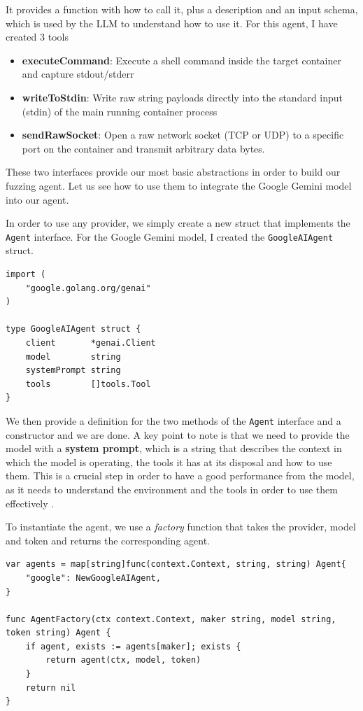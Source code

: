 It provides a function with how to call it, plus a description and an input schema, which is used by the LLM to understand how to use it.
For this agent, I have created 3 tools

\begin{itemize}
   \item \textbf{executeCommand}: Execute a shell command inside the target container and capture stdout/stderr
   \item \textbf{writeToStdin}: Write raw string payloads directly into the standard input (stdin) of the main running container process
   \item \textbf{sendRawSocket}: Open a raw network socket (TCP or UDP) to a specific port on the container and transmit arbitrary data bytes.
\end{itemize}


These two interfaces provide our most basic abstractions in order to build our fuzzing agent. Let us see how to use them to integrate the Google Gemini model into our agent.

In order to use any provider, we simply create a new struct that implements the \texttt{Agent} interface. For the Google Gemini model, I created the \texttt{GoogleAIAgent} struct.

\lstset{language=Go,caption=Google Ai Agent,label=lst:google-ai-agent}
\begin{lstlisting}
import (
	"google.golang.org/genai"
)

type GoogleAIAgent struct {
	client       *genai.Client
	model        string
	systemPrompt string
	tools        []tools.Tool
}
\end{lstlisting}

We then provide a definition for the two methods of the \texttt{Agent} interface and a constructor and we are done.
A key point to note is that we need to provide the model with a \textbf{system prompt}, which is a string that describes the context in which
the model is operating, the tools it has at its disposal and how to use them. This is a crucial step in order to have a good performance from the model,
as it needs to understand the environment and the tools in order to use them effectively 
\cite{system-prompts}.

To instantiate the agent, we use a \textit{factory} function that takes the provider, model and token and returns the 
corresponding agent.

\lstset{language=Go,caption=Agent Factory,label=lst:agent-factory}
\begin{lstlisting}
var agents = map[string]func(context.Context, string, string) Agent{
	"google": NewGoogleAIAgent,
}

func AgentFactory(ctx context.Context, maker string, model string, token string) Agent {
	if agent, exists := agents[maker]; exists {
		return agent(ctx, model, token)
	}
	return nil
}
\end{lstlisting}
